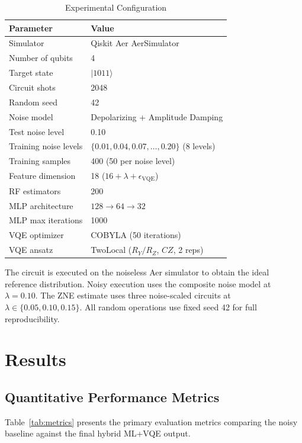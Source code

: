 \documentclass[journal]{IEEEtran}
\begin{document}
\begin{table}[ht]
\caption{Experimental Configuration}
\label{tab:config}
\centering
\begin{tabular}{ll}
\toprule
\textbf{Parameter} & \textbf{Value} \\
\midrule
Simulator & Qiskit Aer AerSimulator \\
Number of qubits & 4 \\
Target state & $|1011\rangle$ \\
Circuit shots & 2048 \\
Random seed & 42 \\
Noise model & Depolarizing + Amplitude Damping \\
Test noise level & 0.10 \\
Training noise levels & $\{0.01, 0.04, 0.07, \ldots, 0.20\}$ (8 levels) \\
Training samples & 400 (50 per noise level) \\
Feature dimension & 18 ($16 + \lambda + \epsilon_{\text{VQE}}$) \\
RF estimators & 200 \\
MLP architecture & $128 \to 64 \to 32$ \\
MLP max iterations & 1000 \\
VQE optimizer & COBYLA (50 iterations) \\
VQE ansatz & TwoLocal ($R_Y/R_Z$, $CZ$, 2 reps) \\
\bottomrule
\end{tabular}
\end{table}

The circuit is executed on the noiseless Aer simulator to obtain the ideal reference distribution. Noisy execution uses the composite noise model at $\lambda = 0.10$. The ZNE estimate uses three noise-scaled circuits at $\lambda \in \{0.05, 0.10, 0.15\}$. All random operations use fixed seed 42 for full reproducibility.

\section{Results}

\subsection{Quantitative Performance Metrics}

Table~\ref{tab:metrics} presents the primary evaluation metrics comparing the noisy baseline against the final hybrid ML+VQE output.
\end{document}
